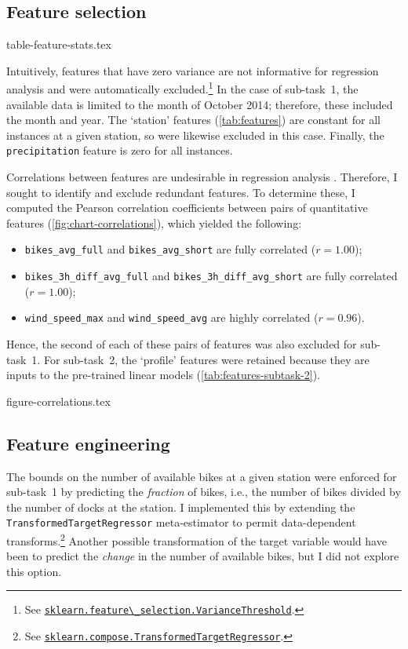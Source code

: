 \documentclass[11pt]{extarticle}
\newcommand{\windspeedmax}{\texttt{wind\_speed\_max}}
\newcommand{\windspeedavg}{\texttt{wind\_speed\_avg}}
\newcommand{\bikesavgfull}{\texttt{bikes\_avg\_full}}
\newcommand{\bikesavgshort}{\texttt{bikes\_avg\_short}}
\newcommand{\bikeshdiffavgfull}{\texttt{bikes\_3h\_diff\_avg\_full}}
\newcommand{\bikeshdiffavgshort}{\texttt{bikes\_3h\_diff\_avg\_short}}
\newcommand{\sklearn}[2]{\href{https://scikit-learn.org/stable/modules/generated/sklearn.#1.#2.html}{\lstinline|sklearn.#1.#2|}}
\begin{document}
\subsection{Feature selection}
\label{sec:feature-selection}

{table-feature-stats.tex}

Intuitively, features that have zero variance are not informative for regression
analysis and were automatically excluded.\footnote{See
  \sklearn{feature\_selection}{VarianceThreshold}.
}
In the case of sub-task~1, the available data is limited to the month of October 2014;
therefore, these included the month and year.
The `station' features (\cref{tab:features}) are constant for all instances at a given
station, so were likewise excluded in this case.
Finally, the \texttt{precipitation} feature is zero for all instances.

Correlations between features are undesirable in regression analysis
\parencite{Alin2010}.
Therefore, I sought to identify and exclude redundant features.
To determine these, I computed the Pearson correlation coefficients between pairs of
quantitative features (\cref{fig:chart-correlations}), which yielded the following:
\begin{itemize}
  \item \texttt{\bikesavgfull} and \texttt{\bikesavgshort} are fully correlated ($r = 1.00$);
  \item \texttt{\bikeshdiffavgfull} and \texttt{\bikeshdiffavgshort} are fully correlated ($r  = 1.00$);
  \item \texttt{\windspeedmax} and \texttt{\windspeedavg} are highly correlated ($r = 0.96$).
\end{itemize}
Hence, the second of each of these pairs of features was also excluded for sub-task~1.
For sub-task~2, the `profile' features were retained because they are inputs to the
pre-trained linear models (\cref{tab:features-subtask-2}).

{figure-correlations.tex}

\subsection{Feature engineering}
\label{sec:feature-engineering}

The bounds on the number of available bikes at a given station were enforced for
sub-task~1 by predicting the \emph{fraction} of bikes, i.e., the number of bikes
divided by the number of docks at the station.
I implemented this by extending the \texttt{TransformedTargetRegressor} meta-estimator
to permit data-dependent transforms.\footnote{See
  \sklearn{compose}{TransformedTargetRegressor}.
}
Another possible transformation of the target variable would have been to predict the
\emph{change} in the number of available bikes, but I did not explore this option.
\end{document}
